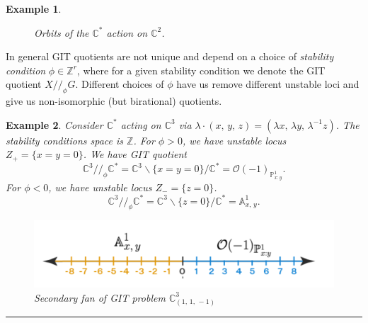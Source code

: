 \documentclass[a0]{a0poster}
\newtheorem{example}{Example}
\begin{document}
\begin{textblock}{7}
\begin{example}
\begin{figure}
    \caption{Orbits of the $\mathbb{C}^*$ action on $\mathbb{C}^2$.}
  \end{figure}  
\end{example}
In general GIT quotients are not unique and depend on a choice of \textit{stability condition} $\phi \in \mathbb{Z}^r$, where for a given stability condition we denote the GIT quotient $X //_{\phi} G$. Different choices of $\phi$ have us remove different unstable loci and give us non-isomorphic (but birational) quotients.
\begin{example}
  Consider $\mathbb{C}^*$ acting on $\mathbb{C}^3$ via $\lambda \cdot (x, \, y, \, z) = (\lambda x,\, \lambda y, \, \lambda^{-1}z)$. The stability conditions space is $\mathbb{Z}$. For $\phi > 0$, we have unstable locus $Z_{+} = \{ x = y = 0 \}$. We have GIT quotient $$\mathbb{C}^3 //_{\phi} \mathbb{C}^* = \mathbb{C}^3 \backslash{\{ x = y = 0 \}} / \mathbb{C}^* = \mathcal{O}(-1)_{\mathbb{P}^1_{x:y}}.$$
   For $\phi < 0$, we have unstable locus $Z_{-} = \{z = 0\}$.
   $$\mathbb{C}^3 //_{\phi} \mathbb{C}^* = \mathbb{C}^3 \backslash{\{ z = 0 \}} / \mathbb{C}^* = \mathbb{A}^1_{x, \, y}.$$
   \begin{figure}
    \centering
    \includegraphics[width=20cm]{diffquotients.png}
    \caption{Secondary fan of GIT problem $\mathbb{C}^3_{(1, \, 1, \, -1 )}$}
  \end{figure}  
\end{example}

\bigskip
\hrule
\end{textblock}
\end{document}

